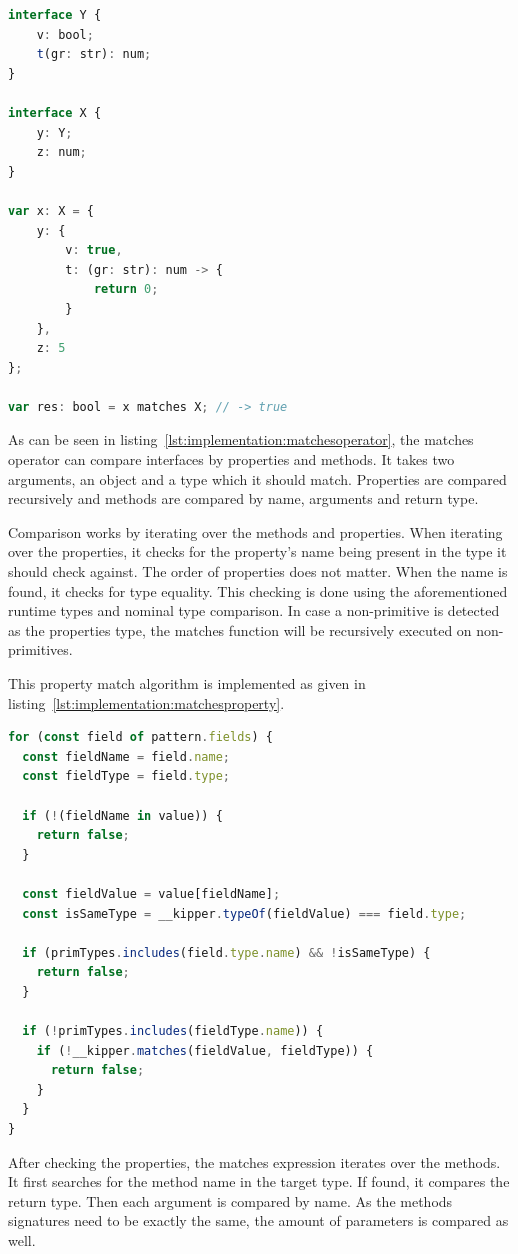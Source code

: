 \begin{lstlisting}[language=Typescript,caption=The Kipper matches operator,label=lst:implementation:matchesoperator]
interface Y {
	v: bool;
	t(gr: str): num;
}

interface X {
	y: Y;
	z: num;
}

var x: X = {
	y: {
		v: true,
		t: (gr: str): num -> {
			return 0;
		}
	},
	z: 5
};

var res: bool = x matches X; // -> true
\end{lstlisting}

As can be seen in listing~\ref{lst:implementation:matchesoperator}, the matches operator can compare interfaces by properties and methods. It takes two arguments, an object and a type which it should match. Properties are compared recursively and methods are compared by name, arguments and return type.

Comparison works by iterating over the methods and properties. When iterating over the properties, it checks for the property's name being present in the type it should check against. The order of properties does not matter. When the name is found, it checks for type equality. This checking is done using the aforementioned runtime types and nominal type comparison. In case a non-primitive is detected as the properties type, the matches function will be recursively executed on non-primitives.

This property match algorithm is implemented as given in listing~\ref{lst:implementation:matchesproperty}.

\begin{lstlisting}[language=Typescript,caption=Matches operator property comparison,label=lst:implementation:matchesproperty]
for (const field of pattern.fields) {
  const fieldName = field.name;
  const fieldType = field.type;

  if (!(fieldName in value)) {
    return false;
  }

  const fieldValue = value[fieldName];
  const isSameType = __kipper.typeOf(fieldValue) === field.type;

  if (primTypes.includes(field.type.name) && !isSameType) {
    return false;
  }

  if (!primTypes.includes(fieldType.name)) {
    if (!__kipper.matches(fieldValue, fieldType)) {
      return false;
    }
  }
}
\end{lstlisting}

After checking the properties, the matches expression iterates over the methods. It first searches for the method name in the target type. If found, it compares the return type. Then each argument is compared by name. As the methods signatures need to be exactly the same, the amount of parameters is compared as well.

